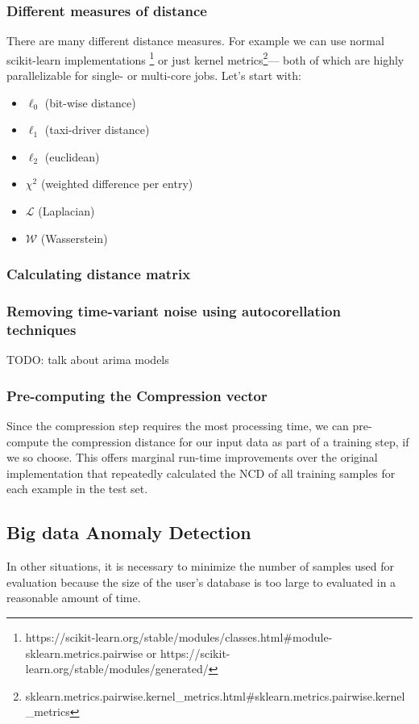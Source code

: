 \documentclass[sigconf]{acmart}
\begin{document}
\subsubsection{Different measures of distance}
There are many different distance measures. For example we can use normal scikit-learn implementations \footnote{
https://scikit-learn.org/stable/modules/classes.html\#module-sklearn.metrics.pairwise or https://scikit-learn.org/stable/modules/generated/} or just kernel metrics\footnote{sklearn.metrics.pairwise.kernel\_metrics.html\#sklearn.metrics.pairwise.kernel\_metrics}--- both of which are highly parallelizable for single- or multi-core jobs. Let's start with:
\begin{itemize}
    \item $\ell_0$ (bit-wise distance)
    \item $\ell_1$ (taxi-driver distance)
    \item $\ell_2$ (euclidean)
    \item $\mathscr{\chi}^2$ (weighted difference per entry)
    \item $\mathscr{L}$ (Laplacian)
    \item $\mathscr{W}$ (Wasserstein)
\end{itemize}

\subsubsection{Calculating distance matrix}

\subsubsection{Removing time-variant noise using autocorellation techniques}

TODO: talk about arima models


\subsubsection{Pre-computing the Compression vector}
Since the compression step requires the most processing time, we can pre-compute the compression distance for our input data as part of a training step, if we so choose. This offers marginal run-time improvements over the original implementation that repeatedly calculated the NCD of all training samples for each example in the test set.

\subsection{Big data Anomaly Detection}
In other situations, it is necessary to minimize the number of samples used for evaluation because the size of the user's database is too large to evaluated in a reasonable amount of time.
\end{document}
